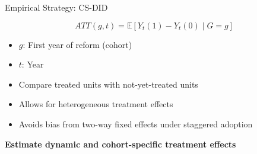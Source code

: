 \documentclass{beamer}
\begin{document}
\begin{frame}{Empirical Strategy: CS-DID}

\[
ATT(g,t) = \mathbb{E}[Y_t(1) - Y_t(0) \mid G = g]
\]

\vspace{0.4cm}

\begin{itemize}
    \item $g$: First year of reform (cohort)
    \item $t$: Year
    \item Compare treated units with not-yet-treated units
\end{itemize}

\vspace{0.4cm}

\begin{itemize}
    \item Allows for heterogeneous treatment effects
    \item Avoids bias from two-way fixed effects under staggered adoption
\end{itemize}

\vspace{0.4cm}

\centering
\textbf{Estimate dynamic and cohort-specific treatment effects}

\end{frame}


\end{document}
